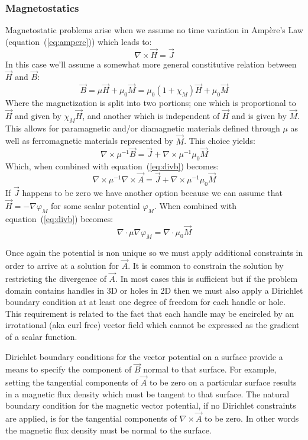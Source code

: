 \documentclass{article}
\newcommand{\refEq}[1]{(\ref{eq:#1})}
\newcommand{\Div}{\nabla\!\cdot\!}
\newcommand{\Curl}{\nabla\!\times\!}
\newcommand{\Grad}{\nabla\!}
\begin{document}
\subsubsection{Magnetostatics}

Magnetostatic problems arise when we assume no time variation in
Amp\`ere's Law (equation~\refEq{ampere}) which leads to:
\[\Curl\vec{H}=\vec{J}\]
In this case we'll assume a somewhat more general constitutive
relation between $\vec{H}$ and $\vec{B}$:
\[\vec{B}=\mu\vec{H}+\mu_0\vec{M} = \mu_0\left(1+\chi_M\right)\vec{H}+\mu_0\vec{M}\]
Where the magnetization is split into two portions; one which is
proportional to $\vec{H}$ and given by $\chi_M\vec{H}$, and another
which is independent of $\vec{H}$ and is given by $\vec{M}$.  This
allows for paramagnetic and/or diamagnetic materials defined through
$\mu$ as well as ferromagnetic materials represented by $\vec{M}$.
This choice yields:
\[\Curl\mu^{-1}\vec{B}=\vec{J}+\Curl\mu^{-1}\mu_0\vec{M}\]
Which, when combined with equation~\refEq{divb} becomes:
\begin{equation}
\Curl\mu^{-1}\Curl\vec{A}=\vec{J}+\Curl\mu^{-1}\mu_0\vec{M}
\end{equation}
If $\vec{J}$ happens to be zero we have another option because we can
assume that $\vec{H} = -\Grad\varphi_M$ for some scalar potential
$\varphi_M$.  When combined with equation~\refEq{divb} becomes:
\begin{equation}
\Div\mu\Grad\varphi_M = \Div\mu_0\vec{M}
\end{equation}

Once again the potential is non unique so we must apply additional
constraints in order to arrive at a solution for $\vec{A}$.  It is
common to constrain the solution by restricting the divergence of
$\vec{A}$.  In most cases this is sufficient but if the problem domain
contains handles in 3D or holes in 2D then we must also apply
a Dirichlet boundary condition at at least one degree of freedom for
each handle or hole.  This requirement is related to the fact that
each handle may be encircled by an irrotational (aka curl free) vector
field which cannot be expressed as the gradient of a scalar function.

Dirichlet boundary conditions for the vector potential on a surface
provide a means to specify the component of $\vec{B}$ normal to that
surface.  For example, setting the tangential components of $\vec{A}$
to be zero on a particular surface results in a magnetic flux density
which must be tangent to that surface.  The natural boundary condition
for the magnetic vector potential, if no Dirichlet constraints are
applied, is for the tangential components of $\Curl\vec{A}$ to be
zero.  In other words the magnetic flux density must be normal to the
surface.
\end{document}
